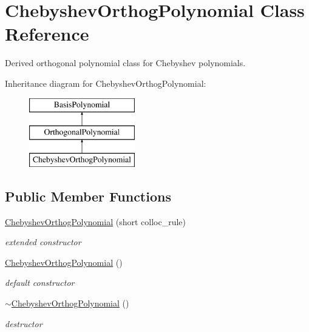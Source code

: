 \section{Chebyshev\+Orthog\+Polynomial Class Reference}
\label{classPecos_1_1ChebyshevOrthogPolynomial}


Derived orthogonal polynomial class for Chebyshev polynomials.  


Inheritance diagram for Chebyshev\+Orthog\+Polynomial\+:\begin{figure}[H]
\begin{center}
\leavevmode
\includegraphics[height=3.000000cm]{classPecos_1_1ChebyshevOrthogPolynomial}
\end{center}
\end{figure}
\subsection*{Public Member Functions}
\begin{DoxyCompactItemize}
\item 
\hyperlink{classPecos_1_1ChebyshevOrthogPolynomial_ac40cce2bd16396062e4f40c84a275733}{Chebyshev\+Orthog\+Polynomial} (short colloc\+\_\+rule)\label{classPecos_1_1ChebyshevOrthogPolynomial_ac40cce2bd16396062e4f40c84a275733}

\begin{DoxyCompactList}\small\item\em extended constructor \end{DoxyCompactList}\item 
\hyperlink{classPecos_1_1ChebyshevOrthogPolynomial_a76aaaf7a64cb6711fb3a06d1624459a6}{Chebyshev\+Orthog\+Polynomial} ()\label{classPecos_1_1ChebyshevOrthogPolynomial_a76aaaf7a64cb6711fb3a06d1624459a6}

\begin{DoxyCompactList}\small\item\em default constructor \end{DoxyCompactList}\item 
\hyperlink{classPecos_1_1ChebyshevOrthogPolynomial_aad18404cb3d8b997796220d180da0e6c}{$\sim$\+Chebyshev\+Orthog\+Polynomial} ()\label{classPecos_1_1ChebyshevOrthogPolynomial_aad18404cb3d8b997796220d180da0e6c}

\begin{DoxyCompactList}\small\item\em destructor \end{DoxyCompactList}\end{DoxyCompactItemize}

